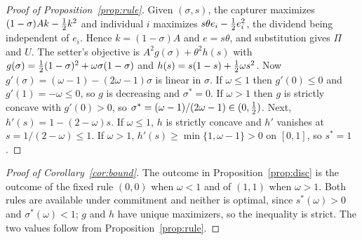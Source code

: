 \begin{proof}[Proof of Proposition~\ref{prop:rule}]
Given $(\sigma,s)$, the capturer maximizes $(1-\sigma)Ak-\tfrac{1}{2} k^2$ and individual $i$
maximizes $s\theta e_i-\tfrac{1}{2} e_i^2$, the dividend being independent of $e_i$. Hence
$k=(1-\sigma)A$ and $e=s\theta$, and substitution gives $\Pi$ and $U$. The setter's
objective is $A^2g(\sigma)+\theta^2h(s)$ with
$g(\sigma)=\tfrac{1}{2}(1-\sigma)^2+\omega\sigma(1-\sigma)$ and
$h(s)=s(1-s)+\tfrac{1}{2}\omega s^2$. Now $g'(\sigma)=(\omega-1)-(2\omega-1)\sigma$ is linear in
$\sigma$. If $\omega\le 1$ then $g'(0)\le 0$ and $g'(1)=-\omega\le 0$, so $g$ is
decreasing and $\sigma^*=0$. If $\omega>1$ then $g$ is strictly concave with $g'(0)>0$,
so $\sigma^*=(\omega-1)/(2\omega-1)\in(0,\tfrac{1}{2})$. Next, $h'(s)=1-(2-\omega)s$. If
$\omega\le 1$, $h$ is strictly concave and $h'$ vanishes at $s=1/(2-\omega)\le 1$. If
$\omega>1$, $h'(s)\ge\min\{1,\omega-1\}>0$ on $[0,1]$, so $s^*=1$.
\end{proof}

\begin{proof}[Proof of Corollary~\ref{cor:bound}]
The outcome in Proposition~\ref{prop:disc} is the outcome of the fixed rule $(0,0)$ when
$\omega<1$ and of $(1,1)$ when $\omega>1$. Both rules are available under commitment and
neither is optimal, since $s^*(\omega)>0$ and $\sigma^*(\omega)<1$; $g$ and $h$ have
unique maximizers, so the inequality is strict. The two values follow from
Proposition~\ref{prop:rule}.
\end{proof}

